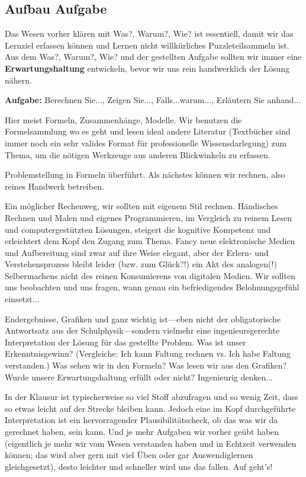 \subsection*{Aufbau Aufgabe}
\begin{Ziel}
Das Wesen vorher klären mit Was?, Warum?, Wie? ist essentiell, damit wir das
Lernziel erfassen können und Lernen nicht willkürliches Puzzleteilsammeln ist.
Aus dem Was?, Warum?, Wie? und der gestellten Aufgabe sollten wir immer eine
\textbf{Erwartungshaltung} entwickeln, bevor wir uns rein handwerklich der Lösung nähern.
\end{Ziel}
\textbf{Aufgabe:} Berechnen Sie..., Zeigen Sie..., Falls...warum..., Erläutern
Sie anhand...
\begin{Werkzeug}
Hier meist Formeln, Zusammenhänge, Modelle. Wir benutzen die Formelsammlung
wo es geht und lesen ideal andere Literatur (Textbücher sind immer noch ein sehr
valides Format für professionelle Wissensdarlegung) zum Thema, um die nötigen
Werkzeuge aus anderen Blickwinkeln zu erfassen.
\end{Werkzeug}
\begin{Ansatz}
Problemstellung in Formeln überführt. Als nächstes können wir rechnen, also
reines Handwerk betreiben.
\end{Ansatz}
\begin{ExCalc}
Ein möglicher Rechenweg, wir sollten mit eigenem Stil
rechnen.
Händisches Rechnen und Malen und eigenes Programmieren, im Vergleich zu reinem
Lesen und computergestützten Lösungen, steigert die kognitive Kompetenz und
erleichtert dem Kopf den Zugang zum Thema.
%
Fancy neue elektronische Medien und Aufbereitung sind zwar auf ihre Weise elegant,
aber der Erlern- und Verstehensprozess bleibt leider (bzw. zum Glück?!) ein
Akt des analogen(!) Selbermachens nicht des reinen Konsumierens von digitalen Medien.
%
Wir sollten uns beobachten und uns fragen, wann genau ein
befriedigendes Belohnungsgefühl einsetzt...
%
\end{ExCalc}
\begin{Loesung}
Endergebnisse, Grafiken und ganz wichtig ist---eben nicht der obligatorische Antwortsatz
aus der Schulphysik---sondern vielmehr eine ingenieursgerechte Interpretation der Lösung
für das gestellte Problem.
%
Was ist unser Erkenntnisgewinn?
%
(Vergleiche: Ich kann Faltung rechnen vs. Ich habe Faltung verstanden.)
%
Was sehen wir in den Formeln?
%
Was lesen wir aus den Grafiken?
%
Wurde unsere Erwartungshaltung erfüllt oder nicht? Ingenieurig denken...

In der Klausur ist typischerweise so viel Stoff abzufragen und so wenig Zeit,
dass so etwas leicht auf der Strecke bleiben kann. Jedoch eine im Kopf
durchgeführte Interpretation ist ein hervorragender Plausibilitätscheck, ob das was
wir da gerechnet haben, sein kann. Und je mehr Aufgaben wir
vorher geübt haben (eigentlich je mehr wir vom Wesen verstanden haben und in
Echtzeit verwenden können; das wird aber gern mit viel Üben oder gar
Auswendiglernen gleichgesetzt),
desto leichter und schneller wird uns das fallen.
%
Auf geht's!
\end{Loesung}

